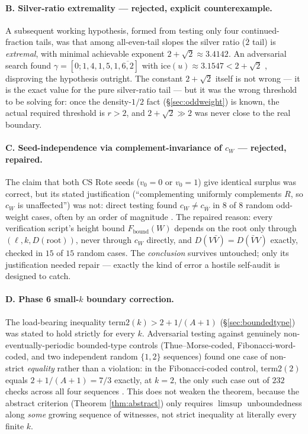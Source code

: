 \documentclass[11pt]{article}
\begin{document}
\paragraph{B. Silver-ratio extremality --- rejected, explicit counterexample.} A subsequent working hypothesis, formed from testing only four continued-fraction tails, was that among all-even-tail slopes the silver ratio ($\overline{2}$ tail) is \emph{extremal}, with minimal achievable exponent $2+\sqrt2\approx3.4142$. An adversarial search found $\gamma=[0;1,4,1,5,1,\overline{6,2}]$ with $\text{ice}(u)\approx3.1547 < 2+\sqrt2$ \cite{Phase4Silver}, disproving the hypothesis outright. The constant $2+\sqrt2$ itself is not wrong --- it is the exact value for the pure silver-ratio tail \cite{Phase4SilverAudit} --- but it was the wrong threshold to be solving for: once the density-$1/2$ fact (\S\ref{sec:oddweight}) is known, the actual required threshold is $r>2$, and $2+\sqrt2\gg2$ was never close to the real boundary.

\paragraph{C. Seed-independence via complement-invariance of $c_W$ --- rejected, repaired.} The claim that both CS Rote seeds ($v_0=0$ or $v_0=1$) give identical surplus was correct, but its stated justification (``complementing uniformly complements $R$, so $c_W$ is unaffected'') was not: direct testing found $c_W\ne c_{\bar W}$ in $8$ of $8$ random odd-weight cases, often by an order of magnitude \cite{Phase5Hostile}. The repaired reason: every verification script's height bound $F_{\text{bound}}(W)$ depends on the root only through $(\ell,k,D(\text{root}))$, never through $c_W$ directly, and $D(V\bar V)=D(\bar V V)$ exactly, checked in $15$ of $15$ random cases. The \emph{conclusion} survives untouched; only its justification needed repair --- exactly the kind of error a hostile self-audit is designed to catch.

\paragraph{D. Phase 6 small-$k$ boundary correction.} The load-bearing inequality $\text{term2}(k)>2+1/(A+1)$ (\S\ref{sec:boundedtype}) was stated to hold strictly for every $k$. Adversarial testing against genuinely non-eventually-periodic bounded-type controls (Thue--Morse-coded, Fibonacci-word-coded, and two independent random $\{1,2\}$ sequences) found one case of non-strict \emph{equality} rather than a violation: in the Fibonacci-coded control, $\text{term2}(2)$ equals $2+1/(A+1)=7/3$ exactly, at $k=2$, the only such case out of $232$ checks across all four sequences \cite{Phase6Arrow}. This does not weaken the theorem, because the abstract criterion (Theorem \ref{thm:abstract}) only requires $\limsup$ unboundedness along \emph{some} growing sequence of witnesses, not strict inequality at literally every finite $k$.
\end{document}
